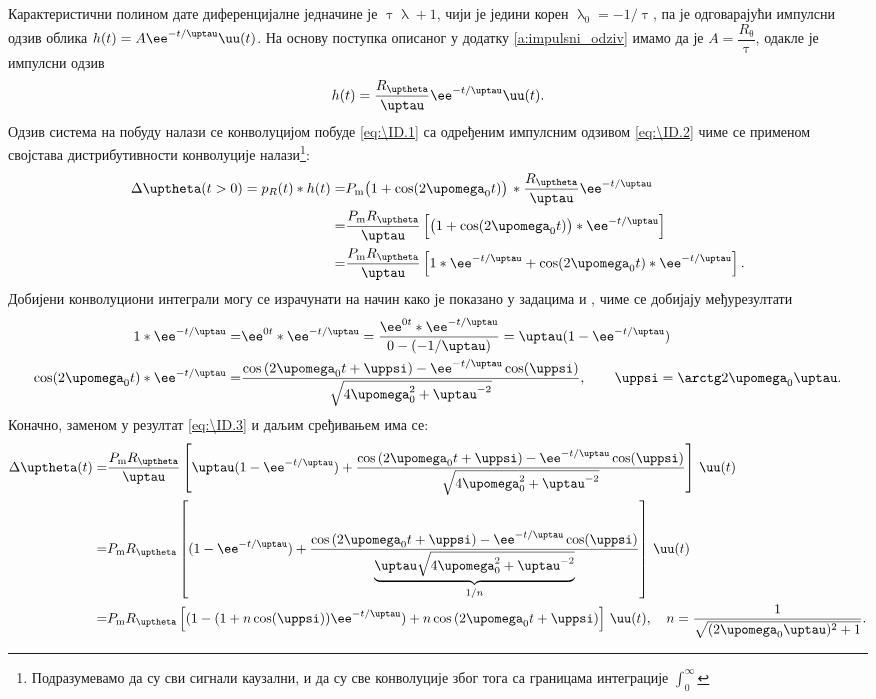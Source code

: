Карактеристични полином дате диференцијалне једначине је $\uptau \uplambda + 1$, чији је једини корен 
$\uplambda_0 = -1/\uptau$, па је одговарајући импулсни одзив облика $h(t) = A \ee^{-t/\uptau} \uu(t)$. На основу 
поступка описаног у додатку \ref{a:impulsni_odziv} имамо да је 
$A = \dfrac{R_{\uptheta}}{\uptau}$, одакле је импулсни одзив 
\begin{equation}
h(t) = \dfrac{R_{\uptheta}}{\uptau} \ee^{-t/\uptau} \uu(t). \label{eq:\ID.2}
\end{equation}
Одзив система на побуду налази се конволуцијом побуде \eqref{eq:\ID.1} са одређеним импулсним одзивом \eqref{eq:\ID.2}
чиме се применом својстава дистрибутивности конволуције налази\footnote{Подразумевамо да су сви сигнали каузални, и 
да су све конволуције због тога са границама интеграције $\int_{0}^{\infty}$}:
\begin{align}
    \Delta\uptheta(t > 0) = p_{R}(t) \ast h(t) =& 
    P_{\rm m} \bigl(1 + \cos(2\upomega_0 t) \bigr) \, \ast \dfrac{R_{\uptheta}}{\uptau} \ee^{-t/\uptau}  \\
    =& \dfrac{P_{\rm m} R_{\uptheta}}{\uptau} 
    \left[ \bigl(1 + \cos(2\upomega_0 t) \bigr)\ast \ee^{-t/\uptau} \right] \\
    =& \dfrac{P_{\rm m} R_{\uptheta}}{\uptau}
    \left[ 1 \ast \ee^{-t/\uptau} + \cos(2\upomega_0 t) \ast \ee^{-t/\uptau} \right]. \label{eq:\ID.3}
\end{align}
Добијени конволуциони интеграли могу се израчунати на начин како је показано у задацима 
 и , чиме се добијају међурезултати
\begin{align}
    1 \ast \ee^{-t/\uptau}  =& \ee^{0t} \ast \ee^{-t/\uptau} =   
    \dfrac{\ee^{0t} \ast \ee^{-t/\uptau}}{ 0 - (-1/\uptau) } = \uptau (1 - \ee^{-t/\uptau}) \\
    \cos(2\upomega_0 t) \ast \ee^{-t/\uptau} =&
    \dfrac{
        \cos\left( 2\upomega_0 t +  \uppsi \right)
        - \ee^{-t/\uptau} \cos(\uppsi)
        }{ \sqrt{ 4\upomega_0^2 + \uptau^{-2} } }, \qquad \uppsi = \arctg 2\upomega_0\uptau.
\end{align}
Коначно, заменом у резултат \eqref{eq:\ID.3} и даљим сређивањем има се:
\begin{align}
    \Delta\uptheta(t) =& \dfrac{P_{\rm m} R_{\uptheta}}{\uptau}
    \left[ \uptau (1 - \ee^{-t/\uptau}) +  
    \dfrac{
        \cos\left( 2\upomega_0 t +  \uppsi \right)
        - \ee^{-t/\uptau} \cos(\uppsi)
        }{ \sqrt{ 4\upomega_0^2 + \uptau^{-2} } } 
    \right] \, \uu(t) \\
    =&
    {P_{\rm m} R_{\uptheta}}
    \left[ (1 - \ee^{-t/\uptau}) +
    \dfrac{
        \cos\left( 2\upomega_0 t +  \uppsi \right)
        - \ee^{-t/\uptau} \cos(\uppsi)
        }{ \underbrace{\uptau  \sqrt{ 4\upomega_0^2 + \uptau^{-2}} }_{1/n} } 
    \right] \, \uu(t) \\
    =& 
    {P_{\rm m} R_{\uptheta}}
    \left[ (1 - (1 + n\cos(\uppsi)) \ee^{-t/\uptau} )
        + n \cos\left( 2\upomega_0 t +  \uppsi \right)
    \right] \, \uu(t), \quad n = \dfrac{1}{ \sqrt{ (2\upomega_0 \uptau )^2 + 1 }}.
\end{align}
